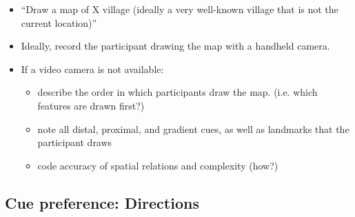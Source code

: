 \documentclass{article}
\begin{document}
\begin{itemize}

\item ``Draw a map of X village (ideally a very well-known village that is not the current location)''

\item Ideally, record the participant drawing the map with a handheld camera.

\item If a video camera is not available: 
	\begin{itemize}

	\item describe the order in which participants draw the map. (i.e. which features are drawn first?)
	
	\item note all distal, proximal, and gradient cues, as well as landmarks that the participant draws
	
	\item code accuracy of spatial relations and complexity (how?)	
	\end{itemize}

 
\end{itemize}


\subsection{Cue preference: Directions}
\end{document}
